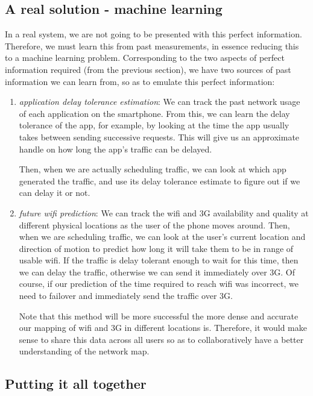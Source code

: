 \documentclass[12pt, fleqn]{article}
\begin{document}
\subsection{A real solution - machine learning}

In a real system, we are not going to be presented with this perfect 
information. Therefore, we must learn this from past measurements, in essence 
reducing this to a machine learning problem. Corresponding to the two aspects of 
perfect information required (from the previous section), we have two sources of 
past information we can learn from, so as to emulate this perfect information:
\begin{enumerate}
     \item \emph{application delay tolerance estimation}: We can
     track the past network usage of each application on the smartphone. From 
     this, we can learn the delay tolerance of the app, for example, by looking
     at the time the app usually takes between sending successive requests. This 
     will give us an approximate handle on how long the app's traffic can be 
     delayed.
     
     Then, when we are actually scheduling traffic, we can look at which app 
     generated the traffic, and use its delay tolerance estimate to figure out 
     if we can delay it or not.
     
    \item \emph{future wifi prediction}: We can track the wifi and 3G 
    availability and quality at different physical locations as the user of the phone moves 
    around. Then, when we are scheduling 
    traffic, we can look at the user's current location and direction of motion 
    to predict how long it will take them to be in range of usable wifi. If the 
    traffic is delay tolerant enough to wait for this time, then we can delay 
    the traffic, otherwise we can send it immediately over 3G. Of course, if our 
    prediction of the time required to reach wifi was incorrect, we need to 
    failover and immediately send the traffic over 3G. 
    
    Note that this method will be more successful the more dense and accurate 
    our mapping of wifi and 3G in different locations is. Therefore, it would 
    make sense to share this data across all users so as to collaboratively have 
    a better understanding of the network map.
\end{enumerate}

\subsection{Putting it all together}
\end{document}
